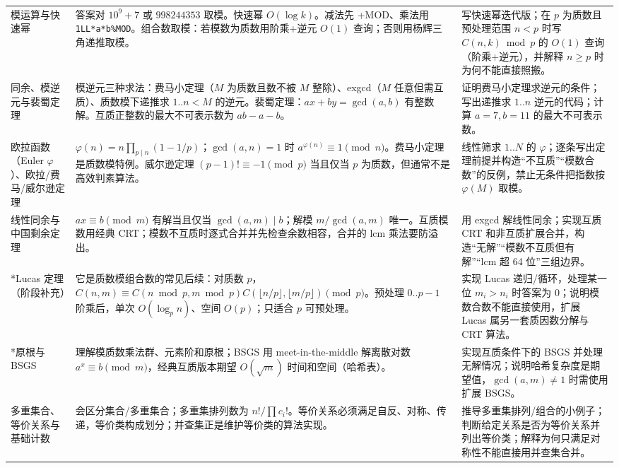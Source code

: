 \documentclass[a4paper,11pt]{article}
\newcommand{\code}[1]{\texttt{#1}}
\begin{document}
\begin{longtable}{L{2.4cm} L{7.5cm} L{6.8cm}}
模运算与快速幂
& 答案对 $10^9+7$ 或 $998244353$ 取模。快速幂 $O(\log k)$。减法先 +MOD、乘法用 \code{1LL*a*b\%MOD}。组合数取模：若模数为质数用阶乘+逆元 $O(1)$ 查询；否则用杨辉三角递推取模。
& 写快速幂迭代版；在 $p$ 为质数且预处理范围 $n<p$ 时写 $C(n,k)\bmod p$ 的 $O(1)$ 查询（阶乘+逆元），并解释 $n\ge p$ 时为何不能直接照搬。\\[2mm]

同余、模逆元与裴蜀定理
& 模逆元三种求法：费马小定理（$M$ 为质数且数不被 $M$ 整除）、exgcd（$M$ 任意但需互质）、质数模下递推求 $1..n<M$ 的逆元。裴蜀定理：$ax+by=\gcd(a,b)$ 有整数解。互质正整数的最大不可表示数为 $ab-a-b$。
& 证明费马小定理求逆元的条件；写出递推求 $1..n$ 逆元的代码；计算 $a=7,b=11$ 的最大不可表示数。\\[2mm]

欧拉函数（Euler $\varphi$）、欧拉/费马/威尔逊定理
& $\varphi(n)=n\prod_{p\mid n}(1-1/p)$；$\gcd(a,n)=1$ 时 $a^{\varphi(n)}\equiv1\pmod n$。费马小定理是质数模特例。威尔逊定理 $(p-1)!\equiv-1\pmod p$ 当且仅当 $p$ 为质数，但通常不是高效判素算法。
& 线性筛求 $1..N$ 的 $\varphi$；逐条写出定理前提并构造“不互质”“模数合数”的反例，禁止无条件把指数按 $\varphi(M)$ 取模。\\[2mm]

线性同余与中国剩余定理
& $ax\equiv b\pmod m$ 有解当且仅当 $\gcd(a,m)\mid b$；解模 $m/\gcd(a,m)$ 唯一。互质模数用经典 CRT；模数不互质时逐式合并并先检查余数相容，合并的 lcm 乘法要防溢出。
& 用 exgcd 解线性同余；实现互质 CRT 和非互质扩展合并，构造“无解”“模数不互质但有解”“lcm 超 64 位”三组边界。\\[2mm]

*Lucas 定理（阶段补充）
& 它是质数模组合数的常见后续：对质数 $p$，$C(n,m)\equiv C(n\bmod p,m\bmod p)C(\lfloor n/p\rfloor,\lfloor m/p\rfloor)\pmod p$。预处理 $0..p-1$ 阶乘后，单次 $O(\log_p n)$、空间 $O(p)$；只适合 $p$ 可预处理。
& 实现 Lucas 递归/循环，处理某一位 $m_i>n_i$ 时答案为 0；说明模数合数不能直接使用，扩展 Lucas 属另一套质因数分解与 CRT 算法。\\[2mm]

*原根与 BSGS
& 理解模质数乘法群、元素阶和原根；BSGS 用 meet-in-the-middle 解离散对数 $a^x\equiv b\pmod m$，经典互质版本期望 $O(\sqrt m)$ 时间和空间（哈希表）。
& 实现互质条件下的 BSGS 并处理无解情况；说明哈希复杂度是期望值，$\gcd(a,m)\ne1$ 时需使用扩展 BSGS。\\[2mm]

多重集合、等价关系与基础计数
& 会区分集合/多重集合；多重集排列数为 $n!/\prod c_i!$。等价关系必须满足自反、对称、传递，等价类构成划分；并查集正是维护等价类的算法实现。
& 推导多重集排列/组合的小例子；判断给定关系是否为等价关系并列出等价类；解释为何只满足对称性不能直接用并查集合并。\\[2mm]


\end{longtable}
\end{document}
